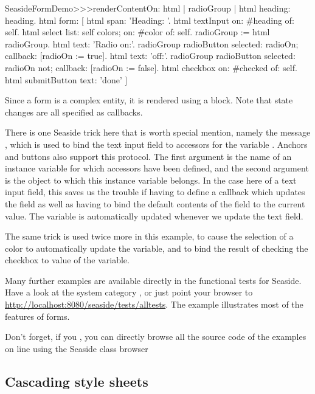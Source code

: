 \documentclass[a4paper,10pt,twoside]{book}
\begin{document}
\begin{code}{}
SeasideFormDemo>>>renderContentOn: html
	| radioGroup |
	html heading: heading.
	html form: [
		html span: 'Heading: '.
		html textInput on: #heading of: self.
		html select
			list: self colors;
			on: #color of: self.
		radioGroup := html radioGroup.
		html text: 'Radio on:'.
		radioGroup radioButton
			selected: radioOn;
			callback: [radioOn := true].
		html text: 'off:'.
		radioGroup radioButton
			selected: radioOn not;
			callback: [radioOn := false].
		html checkbox on: #checked of: self.
		html submitButton
			text: 'done' ]
\end{code}{}

Since a form is a complex entity, it is rendered using a block.
Note that state changes are all specified as callbacks.

There is one Seaside trick here that is worth special mention, namely the message , which is used to bind the text input field to accessors for the variable .
Anchors and buttons also support this protocol.
The first argument is the name of an instance variable for which accessors have been defined, and the second argument is the object to which this instance variable belongs.
In the case here of a text input field, this saves us the trouble if having to define a callback which updates the field as well as having to bind the default contents of the field to the current value.
The  variable is automatically updated whenever we update the text field.

The same trick is used twice more in this example, to cause the selection of a color to automatically update the  variable, and to bind the result of checking the checkbox to value of the  variable.

Many further examples are available directly in the functional tests for Seaside.
Have a look at the system category , or just point your browser to \url{http://localhost:8080/seaside/tests/alltests}.
The  example illustrates most of the features of forms.

Don't forget, if you , you can directly browse all the source code of the examples on line using the Seaside class browser

\subsection{Cascading style sheets}
\label{sec:css}
\end{document}

